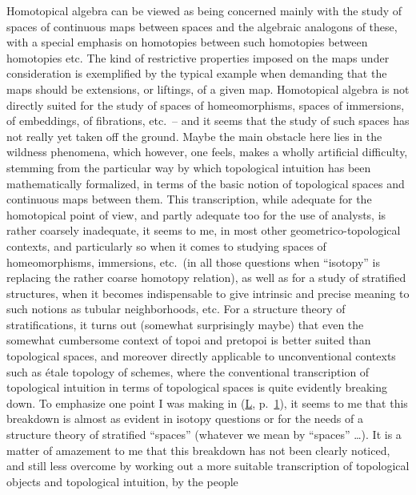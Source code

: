 %
\label{sec:14}%
Homotopical algebra can be viewed as being concerned mainly with the
study of spaces of continuous maps between spaces and the algebraic
analogons of these, with a special emphasis on homotopies between such
homotopies between homotopies etc. The kind of restrictive properties
imposed on the maps under consideration is exemplified by the typical
example when demanding that the maps should be extensions, or
liftings, of a given map. Homotopical algebra is not directly suited
for the study of spaces of homeomorphisms, spaces of immersions, of
embeddings, of fibrations, etc.\ -- and it seems that the study of
such spaces has not really yet taken off the ground. Maybe the main
obstacle here lies in the wildness phenomena, which however, one
feels, makes a wholly artificial difficulty, stemming from the
particular way by which topological intuition has been mathematically
formalized, in terms of the basic notion of topological spaces and
continuous maps between them. This transcription, while adequate for
the homotopical point of view, and partly adequate too for the use of
analysts, is rather coarsely inadequate, it seems to me, in most other
geometrico-topological contexts, and particularly so when it comes to
studying spaces of homeomorphisms, immersions, etc.\ (in all those
questions when ``isotopy'' is replacing the rather coarse homotopy
relation), as well as for a study of stratified structures, when it
becomes indispensable to give intrinsic and precise meaning to such
notions as tubular neighborhoods, etc.  For a structure theory of
stratifications, it turns out (somewhat surprisingly maybe) that even
the somewhat cumbersome context of topoi and pretopoi is better suited
than topological spaces, and moreover directly applicable to
unconventional contexts such as \'etale topology of schemes, where the
conventional transcription of topological intuition in terms of
topological spaces is quite evidently breaking down. To emphasize one
point I was making in (\hyperref[ch:I]L, p.\ \hyperref[p:L.1]{1}), it
seems to me that this breakdown is almost as evident in isotopy
questions or for the needs of a structure theory of stratified
``spaces'' (whatever we mean by ``spaces'' \ldots). It is a matter of
amazement to me that this breakdown has not been clearly noticed, and
still less overcome by working out a more suitable transcription of
topological objects and topological intuition, by the people
